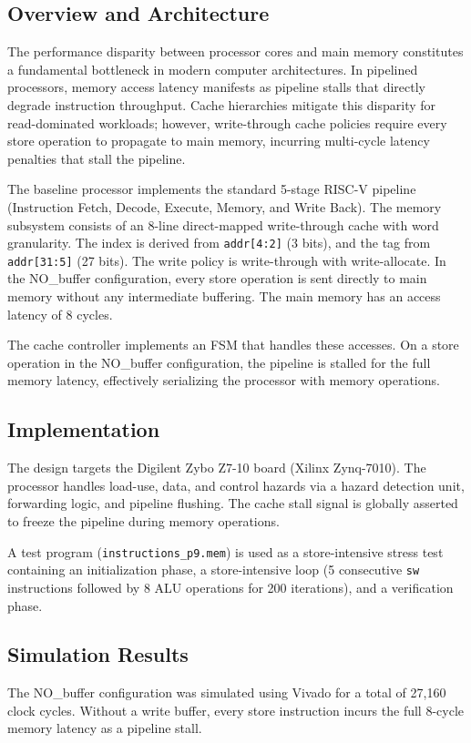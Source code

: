 \documentclass[conference]{IEEEtran}
\begin{document}
\subsection{Overview and Architecture}
The performance disparity between processor cores and main memory constitutes a fundamental bottleneck in modern computer architectures. In pipelined processors, memory access latency manifests as pipeline stalls that directly degrade instruction throughput. Cache hierarchies mitigate this disparity for read-dominated workloads; however, write-through cache policies require every store operation to propagate to main memory, incurring multi-cycle latency penalties that stall the pipeline. 

The baseline processor implements the standard 5-stage RISC-V pipeline (Instruction Fetch, Decode, Execute, Memory, and Write Back). The memory subsystem consists of an 8-line direct-mapped write-through cache with word granularity. The index is derived from \texttt{addr[4:2]} (3 bits), and the tag from \texttt{addr[31:5]} (27 bits). The write policy is write-through with write-allocate. In the NO\_buffer configuration, every store operation is sent directly to main memory without any intermediate buffering. The main memory has an access latency of 8 cycles.

The cache controller implements an FSM that handles these accesses. On a store operation in the NO\_buffer configuration, the pipeline is stalled for the full memory latency, effectively serializing the processor with memory operations. 

\subsection{Implementation}
The design targets the Digilent Zybo Z7-10 board (Xilinx Zynq-7010). The processor handles load-use, data, and control hazards via a hazard detection unit, forwarding logic, and pipeline flushing. The cache stall signal is globally asserted to freeze the pipeline during memory operations. 

A test program (\texttt{instructions\_p9.mem}) is used as a store-intensive stress test containing an initialization phase, a store-intensive loop (5 consecutive \texttt{sw} instructions followed by 8 ALU operations for 200 iterations), and a verification phase. 

\subsection{Simulation Results}
The NO\_buffer configuration was simulated using Vivado for a total of 27,160 clock cycles. Without a write buffer, every store instruction incurs the full 8-cycle memory latency as a pipeline stall.
\end{document}
